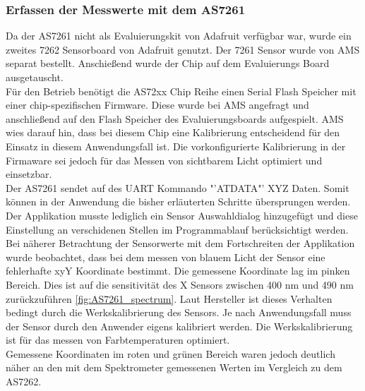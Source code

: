 \documentclass[11pt]{scrartcl}
\begin{document}
\subsubsection{Erfassen der Messwerte mit dem AS7261}
Da der AS7261 nicht als Evaluierungskit von Adafruit verfügbar war, wurde ein zweites 7262 Sensorboard von Adafruit genutzt. Der 7261 Sensor
wurde von AMS separat bestellt. Anschießend wurde der Chip auf dem Evaluierungs Board ausgetauscht.\\
Für den Betrieb benötigt die AS72xx Chip Reihe einen Serial Flash Speicher mit einer chip-spezifischen Firmware. Diese wurde bei AMS angefragt
und anschließend auf den Flash Speicher des Evaluierungsboards aufgespielt. AMS wies darauf hin, dass bei diesem Chip eine Kalibrierung entscheidend
für den Einsatz in diesem Anwendungsfall ist. Die vorkonfigurierte Kalibrierung in der Firmaware sei jedoch für das Messen von sichtbarem Licht
optimiert und einsetzbar.\\
Der AS7261 sendet auf des UART Kommando "'ATDATA"' XYZ Daten. Somit können in der Anwendung die bisher erläuterten Schritte übersprungen werden.
Der Applikation musste lediglich ein Sensor Auswahldialog hinzugefügt und diese Einstellung an verschidenen Stellen im Programmablauf
berücksichtigt werden.\\
Bei näherer Betrachtung der Sensorwerte mit dem Fortschreiten der Applikation wurde beobachtet, dass bei dem messen von blauem Licht der Sensor
eine fehlerhafte xyY Koordinate bestimmt. Die gemessene Koordinate lag im pinken Bereich. Dies ist auf die sensitivität des X Sensors zwischen
400 nm und 490 nm zurückzuführen \ref{fig:AS7261_spectrum}. Laut Hersteller ist dieses Verhalten bedingt durch die Werkskalibrierung des Sensors.
Je nach Anwendungsfall muss der Sensor durch den Anwender eigens kalibriert werden. Die Werkskalibrierung ist für das messen von Farbtemperaturen
optimiert.\\
Gemessene Koordinaten im roten und grünen Bereich waren jedoch deutlich näher an den mit dem Spektrometer gemessenen Werten im Vergleich zu
dem AS7262. %
\end{document}

